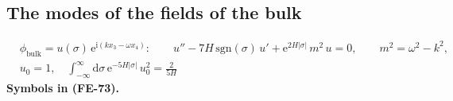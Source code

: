 \documentclass[
  10pt,
]{article}
\begin{document}
\hypertarget{the-modes-of-the-fields-of-the-bulk}{%
\subsection{The modes of the fields of the
bulk}\label{the-modes-of-the-fields-of-the-bulk}}

\[
\begin{aligned}
&\phi_{\mathrm{bulk}} = u(\sigma)\,\mathrm{e}^{\mathrm{i}(kx_3 - \omega x_4)}:\qquad
u'' - 7H\,\mathrm{sgn}(\sigma)\,u' + \mathrm{e}^{2H\lvert\sigma\rvert}\,m^2\,u = 0,\qquad m^2 = \omega^2 - k^2,\\
&u_0 = 1,\quad \int_{-\infty}^{\infty}\mathrm{d}\sigma\,\mathrm{e}^{-5H\lvert\sigma\rvert}\,u_0^2 = \frac{2}{5H}
\end{aligned} \tag{FE-73}
\] \textbf{Symbols in (FE-73).}
\end{document}
